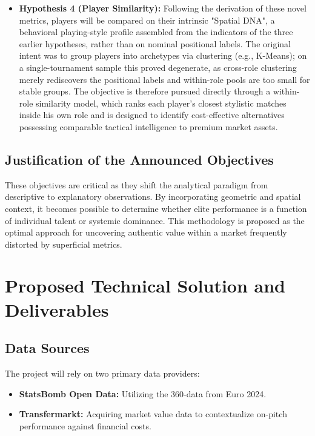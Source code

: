 \documentclass[12pt,a4paper]{article}
\begin{document}
\begin{itemize}
    \item \textbf{Hypothesis 4 (Player Similarity):} Following the derivation of these novel metrics, players will be compared on their intrinsic "Spatial DNA", a behavioral playing-style profile assembled from the indicators of the three earlier hypotheses, rather than on nominal positional labels. The original intent was to group players into archetypes via clustering (e.g., K-Means); on a single-tournament sample this proved degenerate, as cross-role clustering merely rediscovers the positional labels and within-role pools are too small for stable groups. The objective is therefore pursued directly through a within-role similarity model, which ranks each player's closest stylistic matches inside his own role and is designed to identify cost-effective alternatives possessing comparable tactical intelligence to premium market assets.
\end{itemize}

\subsection{Justification of the Announced Objectives}
These objectives are critical as they shift the analytical paradigm from descriptive to explanatory observations. By incorporating geometric and spatial context, it becomes possible to determine whether elite performance is a function of individual talent or systemic dominance. This methodology is proposed as the optimal approach for uncovering authentic value within a market frequently distorted by superficial metrics.

\section{Proposed Technical Solution and Deliverables}

\subsection{Data Sources}
The project will rely on two primary data providers:
\begin{itemize}
    \item \textbf{StatsBomb Open Data:} Utilizing the 360-data from Euro 2024. 
    \item \textbf{Transfermarkt:} Acquiring market value data to contextualize on-pitch performance against financial costs.
\end{itemize}
\end{document}
